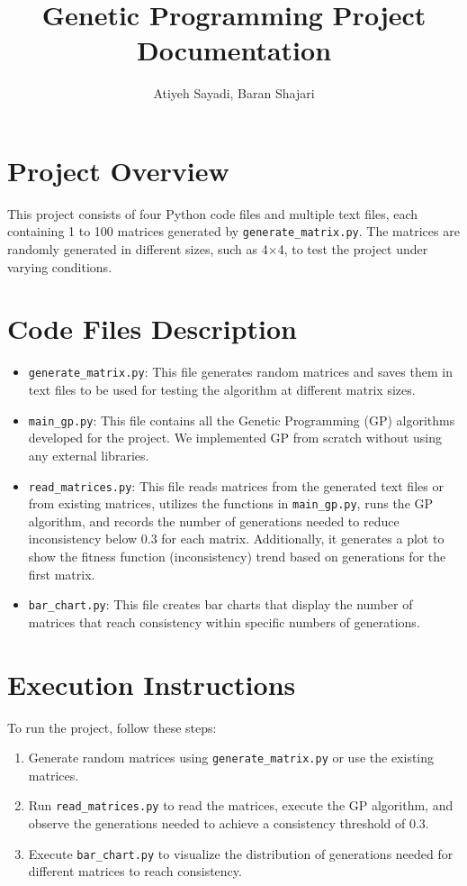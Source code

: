 \documentclass{article}
\title{Genetic Programming Project Documentation}
\author{Atiyeh Sayadi, Baran Shajari}
\date{}
\begin{document}
\maketitle

\section{Project Overview}
This project consists of four Python code files and multiple text files, each containing 1 to 100 matrices generated by \texttt{generate\_matrix.py}. The matrices are randomly generated in different sizes, such as 4\(\times\)4, to test the project under varying conditions.

\section{Code Files Description}
\begin{itemize}
    \item \texttt{generate\_matrix.py}: This file generates random matrices and saves them in text files to be used for testing the algorithm at different matrix sizes.
    \item \texttt{main\_gp.py}: This file contains all the Genetic Programming (GP) algorithms developed for the project. We implemented GP from scratch without using any external libraries.
    \item \texttt{read\_matrices.py}: This file reads matrices from the generated text files or from existing matrices, utilizes the functions in \texttt{main\_gp.py}, runs the GP algorithm, and records the number of generations needed to reduce inconsistency below 0.3 for each matrix. Additionally, it generates a plot to show the fitness function (inconsistency) trend based on generations for the first matrix.
    \item \texttt{bar\_chart.py}: This file creates bar charts that display the number of matrices that reach consistency within specific numbers of generations.
\end{itemize}

\section{Execution Instructions}
To run the project, follow these steps:
\begin{enumerate}
    \item Generate random matrices using \texttt{generate\_matrix.py} or use the existing matrices.
    \item Run \texttt{read\_matrices.py} to read the matrices, execute the GP algorithm, and observe the generations needed to achieve a consistency threshold of 0.3.
    \item Execute \texttt{bar\_chart.py} to visualize the distribution of generations needed for different matrices to reach consistency.
\end{enumerate}
\end{document}
